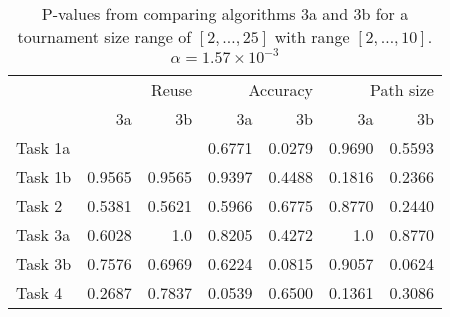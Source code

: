 \begin{table}[h]
    \centering
    \begin{tabular}{lrrrrrr}
            & \multicolumn{2}{r}{Reuse} & \multicolumn{2}{r}{Accuracy} & \multicolumn{2}{r}{Path size} \\
            & 3a          & 3b          & 3a            & 3b           & 3a            & 3b            \\
    Task 1a &             &             & 0.6771        & 0.0279       & 0.9690        & 0.5593        \\
    Task 1b & 0.9565      & 0.9565      & 0.9397        & 0.4488       & 0.1816        & 0.2366        \\
    Task 2  & 0.5381      & 0.5621      & 0.5966        & 0.6775       & 0.8770        & 0.2440        \\
    Task 3a & 0.6028      & 1.0         & 0.8205        & 0.4272       & 1.0           & 0.8770        \\
    Task 3b & 0.7576      & 0.6969      & 0.6224        & 0.0815       & 0.9057        & 0.0624        \\
    Task 4  & 0.2687      & 0.7837      & 0.0539        & 0.6500       & 0.1361        & 0.3086       
    \end{tabular}
    \caption{P-values from comparing algorithms 3a and 3b for a tournament size range of \([2,\dots,25]\) with range \([2,\dots,10]\). \(\alpha=1.57\times 10^{-3}\)}
    \label{tab:exp2.dynamic_rerun}
\end{table}